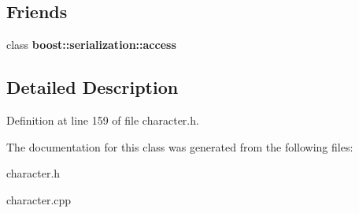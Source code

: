 \subsection*{Friends}
\begin{DoxyCompactItemize}
\item 
\hypertarget{class_enemy_ac98d07dd8f7b70e16ccb9a01abf56b9c}{}\label{class_enemy_ac98d07dd8f7b70e16ccb9a01abf56b9c} 
class {\bfseries boost\+::serialization\+::access}
\end{DoxyCompactItemize}


\subsection{Detailed Description}


Definition at line 159 of file character.\+h.



The documentation for this class was generated from the following files\+:\begin{DoxyCompactItemize}
\item 
character.\+h\item 
character.\+cpp\end{DoxyCompactItemize}
